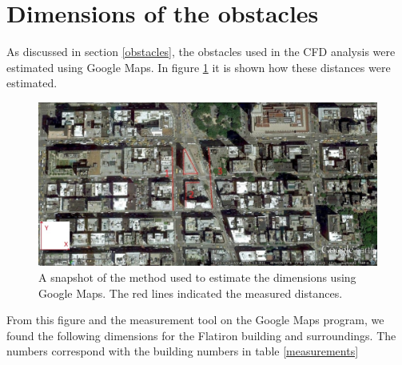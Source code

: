 \appendix
\section{Dimensions of the obstacles}
As discussed in section \ref{obstacles}, the obstacles used in the CFD analysis were estimated using Google Maps. In figure \ref{maps} it is shown how these distances were estimated. 
\begin{figure}[b]
\centering
\includegraphics[width = \textwidth]{flatironafschatting.jpg}
\caption{A snapshot of the method used to estimate the dimensions using Google Maps. The red lines indicated the measured distances. }
\label{maps}
\end{figure}
From this figure and the measurement tool on the Google Maps program, we found the following dimensions for the Flatiron building and surroundings. The numbers correspond with the building numbers in table \ref{measurements}
